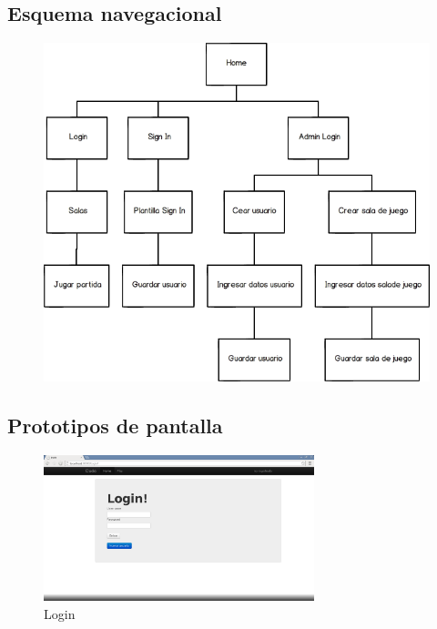 \documentclass[a4paper,11pt]{article}
\begin{document}
\subsection{Esquema navegacional}
\begin{figure}[h]
	\centering
	\includegraphics[width=\textwidth]{Esquema_navegacional.png}
\end{figure}
\newpage

\subsection{Prototipos de pantalla}
\begin{figure}[h!]
	\centering
	\includegraphics[width=0.7\textwidth]{Login.png}
	\caption{Login}
\end{figure}
\end{document}
